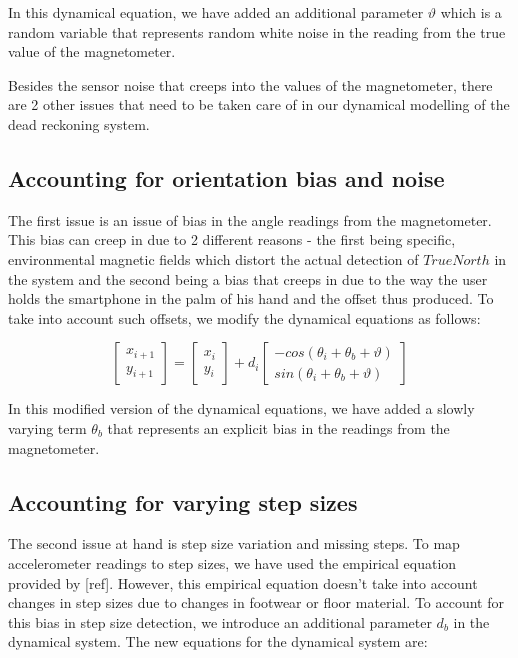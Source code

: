 In this dynamical equation, we have added an additional parameter $\vartheta$ which is a random variable that represents random white noise in the reading from the true value of the magnetometer.

Besides the sensor noise that creeps into the values of the magnetometer, there are 2 other issues that need to be taken care of in our dynamical modelling of the dead reckoning system.

\subsection{Accounting for orientation bias and noise}

The first issue is an issue of bias in the angle readings from the magnetometer. This bias can creep in due to 2 different reasons - the first being specific, environmental magnetic fields which distort the actual detection of $TrueNorth$  in the system and the second being a bias that creeps in due to the way the user holds the smartphone in the palm of his hand and the offset thus produced. To take into account such offsets, we modify the dynamical equations as follows:

\begin{equation}
\begin{bmatrix}x_{i+1}\\
y_{i+1}
\end{bmatrix} = \begin{bmatrix}x_{i}\\
y_{i}
\end{bmatrix}  + d{}_{i} \begin{bmatrix}-cos(\theta_{i}+\theta_{b}+\vartheta)\\
sin(\theta_{i}+\theta_{b}+\vartheta)
\end{bmatrix} 
\end{equation}

In this modified version of the dynamical equations, we have added a slowly
varying term $\theta_{b}$ that represents an explicit bias in the readings from
the magnetometer.

\subsection{Accounting for varying step sizes}

The second issue at hand is step size variation and missing steps. To map
accelerometer readings to step sizes, we have used the empirical equation
provided by [ref]. However, this empirical equation doesn't take into account
changes in step sizes due to changes in footwear or floor material. To account
for this bias in step size detection, we introduce an additional parameter
$d_{b}$ in the dynamical system. The new equations for the dynamical system are:

